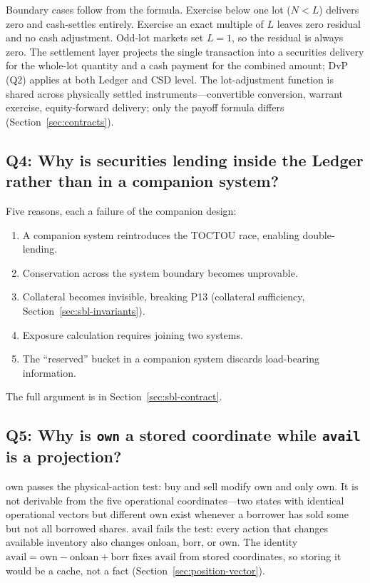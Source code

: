 Boundary cases follow from the formula. Exercise below one lot ($N<L$) delivers zero and cash-settles entirely. Exercise an exact multiple of $L$ leaves zero residual and no cash adjustment. Odd-lot markets set $L=1$, so the residual is always zero. The settlement layer projects the single transaction into a securities delivery for the whole-lot quantity and a cash payment for the combined amount; DvP (Q2) applies at both Ledger and CSD level. The lot-adjustment function is shared across physically settled instruments---convertible conversion, warrant exercise, equity-forward delivery; only the payoff formula differs (Section~\ref{sec:contracts}).

\subsection*{Q4: Why is securities lending inside the Ledger rather than in a companion system?}

Five reasons, each a failure of the companion design:

\begin{enumerate}[nosep]
\item A companion system reintroduces the TOCTOU race, enabling double-lending.
\item Conservation across the system boundary becomes unprovable.
\item Collateral becomes invisible, breaking P13 (collateral sufficiency, Section~\ref{sec:sbl-invariants}).
\item Exposure calculation requires joining two systems.
\item The ``reserved'' bucket in a companion system discards load-bearing information.
\end{enumerate}

\noindent The full argument is in Section~\ref{sec:sbl-contract}.

\subsection*{Q5: Why is \texttt{own} a stored coordinate while \texttt{avail} is a projection?}

$\mathrm{own}$ passes the physical-action test: buy and sell modify $\mathrm{own}$ and only $\mathrm{own}$. It is not derivable from the five operational coordinates---two states with identical operational vectors but different $\mathrm{own}$ exist whenever a borrower has sold some but not all borrowed shares. $\mathrm{avail}$ fails the test: every action that changes available inventory also changes $\mathrm{onloan}$, $\mathrm{borr}$, or $\mathrm{own}$. The identity $\mathrm{avail} = \mathrm{own} - \mathrm{onloan} + \mathrm{borr}$ fixes $\mathrm{avail}$ from stored coordinates, so storing it would be a cache, not a fact (Section~\ref{sec:position-vector}).

